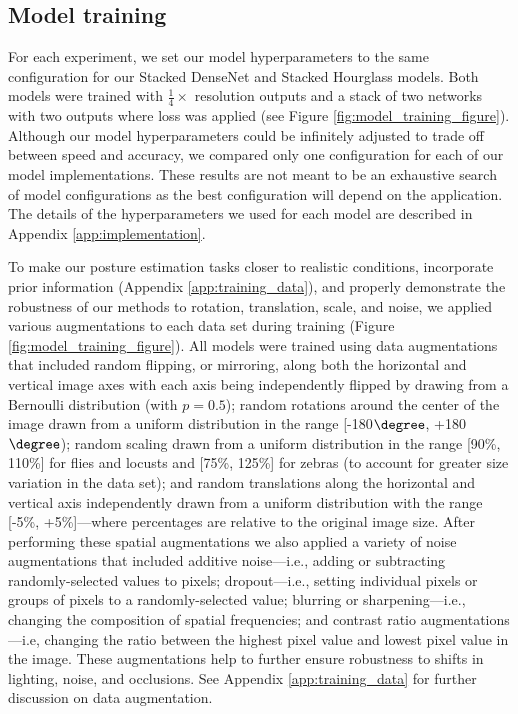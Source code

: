 \documentclass[11pt,a4paper,oneside]{book}
\begin{document}
\subsection{Model training}
For each experiment, we set our model hyperparameters to the same configuration for our Stacked DenseNet and Stacked Hourglass models. Both models were trained with $\tfrac{1}{4}\times$ resolution outputs and a stack of two networks with two outputs where loss was applied (see Figure \ref{fig:model_training_figure}). Although our model hyperparameters could be infinitely adjusted to trade off between speed and accuracy, we compared only one configuration for each of our model implementations. These results are not meant to be an exhaustive search of model configurations as the best configuration will depend on the application. The details of the hyperparameters we used for each model are described in Appendix \ref{app:implementation}.

To make our posture estimation tasks closer to realistic conditions, incorporate prior information (Appendix \ref{app:training_data}), and properly demonstrate the robustness of our methods to rotation, translation, scale, and noise, we applied various augmentations to each data set during training (Figure \ref{fig:model_training_figure}). All models were trained using data augmentations that included random flipping, or mirroring, along both the horizontal and vertical image axes with each axis being independently flipped by drawing from a Bernoulli distribution (with $p=0.5$); random rotations around the center of the image drawn from a uniform distribution in the range [-180$\degree$, +180$\degree$); random scaling drawn from a uniform distribution in the range [90\%, 110\%] for flies and locusts and [75\%, 125\%] for zebras (to account for greater size variation in the data set); and random translations along the horizontal and vertical axis independently drawn from a uniform distribution with the range [-5\%, +5\%]---where percentages are relative to the original image size. After performing these spatial augmentations we also applied a variety of noise augmentations that included additive noise---i.e., adding or subtracting randomly-selected values to pixels; dropout---i.e., setting individual pixels or groups of pixels to a randomly-selected value; blurring or sharpening---i.e., changing the composition of spatial frequencies; and contrast ratio augmentations---i.e, changing the ratio between the highest pixel value and lowest pixel value in the image. These augmentations help to further ensure robustness to shifts in lighting, noise, and occlusions. See Appendix \ref{app:training_data} for further discussion on data augmentation.
\end{document}

